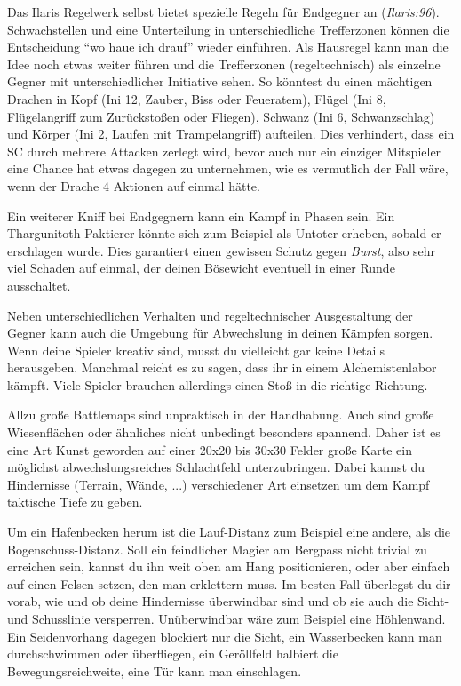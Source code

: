 Das Ilaris Regelwerk selbst bietet spezielle Regeln für Endgegner an (\textit{Ilaris:96}). Schwachstellen und eine Unterteilung in unterschiedliche Trefferzonen können die Entscheidung \enquote{wo haue ich drauf} wieder einführen.
Als Hausregel kann man die Idee noch etwas weiter führen und die Trefferzonen (regeltechnisch) als einzelne Gegner mit unterschiedlicher Initiative sehen.
So könntest du einen mächtigen Drachen in Kopf (Ini 12, Zauber, Biss oder Feueratem), Flügel (Ini 8, Flügelangriff zum Zurückstoßen oder Fliegen), Schwanz (Ini 6, Schwanzschlag) und Körper (Ini 2, Laufen mit Trampelangriff) aufteilen.
Dies verhindert, dass ein SC durch mehrere Attacken zerlegt wird, bevor auch nur ein einziger Mitspieler eine Chance hat etwas dagegen zu unternehmen, wie es vermutlich der Fall wäre, wenn der Drache 4 Aktionen auf einmal hätte.



Ein weiterer Kniff bei Endgegnern kann ein Kampf in Phasen sein.
Ein Thargunitoth-Paktierer könnte sich zum Beispiel als Untoter erheben, sobald er erschlagen wurde.
Dies garantiert einen gewissen Schutz gegen \textit{Burst}, also sehr viel Schaden auf einmal, der deinen Bösewicht eventuell in einer Runde ausschaltet.


Neben unterschiedlichen Verhalten und regeltechnischer Ausgestaltung der Gegner kann auch die Umgebung für Abwechslung in deinen Kämpfen sorgen.
Wenn deine Spieler kreativ sind, musst du vielleicht gar keine Details herausgeben.
Manchmal reicht es zu sagen, dass ihr in einem Alchemistenlabor kämpft.
Viele Spieler brauchen allerdings einen Stoß in die richtige Richtung. 

Allzu große Battlemaps sind unpraktisch in der Handhabung.
Auch sind große Wiesenflächen oder ähnliches nicht unbedingt besonders spannend.
Daher ist es eine Art Kunst geworden auf einer 20x20 bis 30x30 Felder große Karte ein möglichst abwechslungsreiches Schlachtfeld unterzubringen. Dabei kannst du Hindernisse (Terrain, Wände, ...) verschiedener Art einsetzen um dem Kampf taktische Tiefe zu geben. 

Um ein Hafenbecken herum ist die Lauf-Distanz zum Beispiel eine andere, als die Bogenschuss-Distanz.
Soll ein feindlicher Magier am Bergpass nicht trivial zu erreichen sein, kannst du ihn weit oben am Hang positionieren, oder aber einfach auf einen Felsen setzen, den man erklettern muss.
Im besten Fall überlegst du dir vorab, wie und ob deine Hindernisse überwindbar sind und ob sie auch die Sicht- und Schusslinie versperren.
Unüberwindbar wäre zum Beispiel eine Höhlenwand. Ein Seidenvorhang dagegen blockiert nur die Sicht, ein Wasserbecken kann man durchschwimmen oder überfliegen, ein Geröllfeld halbiert die Bewegungsreichweite, eine Tür kann man einschlagen.

